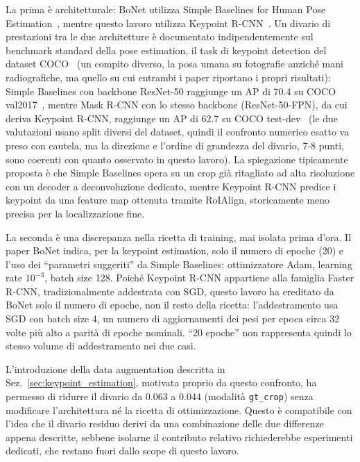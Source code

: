 La prima è architetturale: BoNet utilizza Simple Baselines for Human
Pose Estimation~\cite{xiao2018simplebaselines}, mentre questo lavoro
utilizza Keypoint R-CNN~\cite{he2017maskrcnn}. Un divario di prestazioni
tra le due architetture è documentato indipendentemente sul benchmark
standard della pose estimation, il task di keypoint detection del
dataset COCO~\cite{lin2014coco} (un compito diverso, la posa umana su
fotografie anziché mani radiografiche, ma quello su cui entrambi i paper
riportano i propri risultati): Simple Baselines con backbone ResNet-50
raggiunge un AP di 70.4 su COCO val2017~\cite{xiao2018simplebaselines},
mentre Mask R-CNN con lo stesso backbone (ResNet-50-FPN), da cui deriva
Keypoint R-CNN, raggiunge un AP di 62.7 su COCO
test-dev~\cite{he2017maskrcnn} (le due valutazioni usano split diversi
del dataset, quindi il confronto numerico esatto va preso con cautela,
ma la direzione e l'ordine di grandezza del divario, 7-8 punti, sono
coerenti con quanto osservato in questo lavoro). La spiegazione
tipicamente proposta è che Simple Baselines opera su un crop già
ritagliato ad alta risoluzione con un decoder a deconvoluzione dedicato,
mentre Keypoint R-CNN predice i keypoint da una feature map ottenuta
tramite RoIAlign, storicamente meno precisa per la localizzazione fine.

La seconda è una discrepanza nella ricetta di training, mai isolata
prima d'ora. Il paper BoNet indica, per la keypoint estimation, solo il
numero di epoche (20) e l'uso dei ``parametri suggeriti'' da Simple
Baselines: ottimizzatore Adam, learning rate $10^{-3}$, batch size 128.
Poiché Keypoint R-CNN appartiene alla famiglia Faster R-CNN,
tradizionalmente addestrata con SGD, questo lavoro ha ereditato da
BoNet solo il numero di epoche, non il resto della ricetta:
l'addestramento usa SGD con batch size 4, un numero di aggiornamenti dei
pesi per epoca circa 32 volte più alto a parità di epoche nominali. ``20
epoche'' non rappresenta quindi lo stesso volume di addestramento nei
due casi.

L'introduzione della data augmentation descritta in
Sez.~\ref{sec:keypoint_estimation}, motivata proprio da questo
confronto, ha permesso di ridurre il divario da 0.063 a 0.044 (modalità
\texttt{gt\_crop}) senza modificare l'architettura né la ricetta di
ottimizzazione. Questo è compatibile con l'idea che il divario residuo
derivi da una combinazione delle due differenze appena descritte,
sebbene isolarne il contributo relativo richiederebbe esperimenti
dedicati, che restano fuori dallo scope di questo lavoro.

